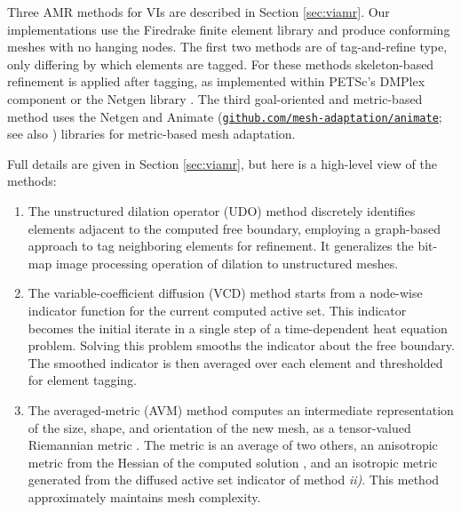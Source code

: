\documentclass[]{interact}
\theoremstyle{plain}%
\theoremstyle{definition}
\theoremstyle{remark}
\begin{document}
Three AMR methods for VIs are described in Section \ref{sec:viamr}.  Our implementations use the Firedrake finite element library \cite{Rathgeberetal2016} and produce conforming meshes with no hanging nodes.  The first two methods are of tag-and-refine type, only differing by which elements are tagged.  For these methods skeleton-based refinement \cite{PlazaCarey2000} is applied after tagging, as implemented within PETSc's DMPlex component \cite{petsc-user-ref} or the Netgen library \cite{Betteridgeetal2024}.  The third goal-oriented and metric-based method uses the Netgen and Animate (\href{https://github.com/mesh-adaptation/animate}{{\small \texttt{github.com/mesh-adaptation/animate}}}; see also \cite{Wallworketal2020}) libraries for metric-based mesh adaptation.

Full details are given in Section \ref{sec:viamr}, but here is a high-level view of the methods:

\renewcommand{\labelenumi}{\emph{\roman{enumi})}}
\begin{enumerate}
\item The unstructured dilation operator (UDO) method discretely identifies elements adjacent to the computed free boundary, employing a graph-based approach to tag neighboring elements for refinement.  It generalizes the bit-map image processing operation of dilation \cite{Pratt1991} to unstructured meshes.
\item The variable-coefficient diffusion (VCD) method starts from a node-wise indicator function for the current computed active set.  This indicator becomes the initial iterate in a single step of a time-dependent heat equation problem.  Solving this problem smooths the indicator about the free boundary.  The smoothed indicator is then averaged over each element and thresholded for element tagging.
\item The averaged-metric (AVM) method computes an intermediate representation of the size, shape, and orientation of the new mesh, as a tensor-valued Riemannian metric \cite{Alauzet2010}.  The metric is an average of two others, an anisotropic metric from the Hessian of the computed solution \cite{Wallworketal2020}, and an isotropic metric generated from the diffused active set indicator of method \emph{ii)}.  This method approximately maintains mesh complexity.
\end{enumerate}
\end{document}
